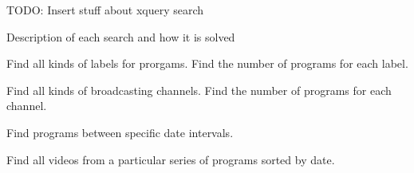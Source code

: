 TODO: Insert stuff about xquery search

Description of each search and how it is solved

Find all kinds of labels for prorgams.
Find the number of programs for each label.

Find all kinds of broadcasting channels.
Find the number of programs for each channel.

Find programs between specific date intervals.

Find all videos from a particular series of programs sorted by date.

